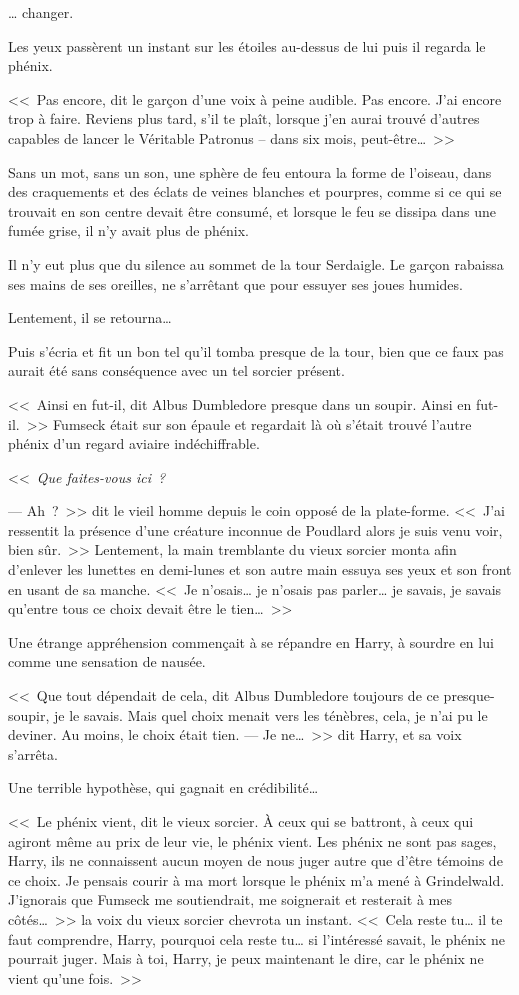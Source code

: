 … changer.

Les yeux passèrent un instant sur les étoiles au-dessus de lui puis il regarda le phénix.

<<~Pas encore, dit le garçon d'une voix à peine audible. Pas encore. J'ai encore trop à faire. Reviens plus tard, s'il te plaît, lorsque j'en aurai trouvé d'autres capables de lancer le Véritable Patronus -- dans six mois, peut-être…~>>

Sans un mot, sans un son, une sphère de feu entoura la forme de l'oiseau, dans des craquements et des éclats de veines blanches et pourpres, comme si ce qui se trouvait en son centre devait être consumé, et lorsque le feu se dissipa dans une fumée grise, il n'y avait plus de phénix.

Il n'y eut plus que du silence au sommet de la tour Serdaigle. Le garçon rabaissa ses mains de ses oreilles, ne s'arrêtant que pour essuyer ses joues humides.

Lentement, il se retourna…

Puis s'écria et fit un bon tel qu'il tomba presque de la tour, bien que ce faux pas aurait été sans conséquence avec un tel sorcier présent.

<<~Ainsi en fut-il, dit Albus Dumbledore presque dans un soupir. Ainsi en fut-il.~>> Fumseck était sur son épaule et regardait là où s'était trouvé l'autre phénix d'un regard aviaire indéchiffrable.

<<~\emph{Que faites-vous ici~? }

---  Ah~?~>> dit le vieil homme depuis le coin opposé de la plate-forme. <<~J'ai ressentit la présence d'une créature inconnue de Poudlard alors je suis venu voir, bien sûr.~>> Lentement, la main tremblante du vieux sorcier monta afin d'enlever les lunettes en demi-lunes et son autre main essuya ses yeux et son front en usant de sa manche. <<~Je n'osais… je n'osais pas parler… je savais, je savais qu'entre tous ce choix devait être le tien…~>>

Une étrange appréhension commençait à se répandre en Harry, à sourdre en lui comme une sensation de nausée.

<<~Que tout dépendait de cela, dit Albus Dumbledore toujours de ce presque-soupir, je le savais. Mais quel choix menait vers les ténèbres, cela, je n'ai pu le deviner. Au moins, le choix était tien.
---  Je ne…~>> dit Harry, et sa voix s'arrêta.

Une terrible hypothèse, qui gagnait en crédibilité…

<<~Le phénix vient, dit le vieux sorcier. À ceux qui se battront, à ceux qui agiront même au prix de leur vie, le phénix vient. Les phénix ne sont pas sages, Harry, ils ne connaissent aucun moyen de nous juger autre que d'être témoins de ce choix. Je pensais courir à ma mort lorsque le phénix m'a mené à Grindelwald. J'ignorais que Fumseck me soutiendrait, me soignerait et resterait à mes côtés…~>> la voix du vieux sorcier chevrota un instant. <<~Cela reste tu… il te faut comprendre, Harry, pourquoi cela reste tu… si l'intéressé savait, le phénix ne pourrait juger. Mais à toi, Harry, je peux maintenant le dire, car le phénix ne vient qu'une fois.~>>

